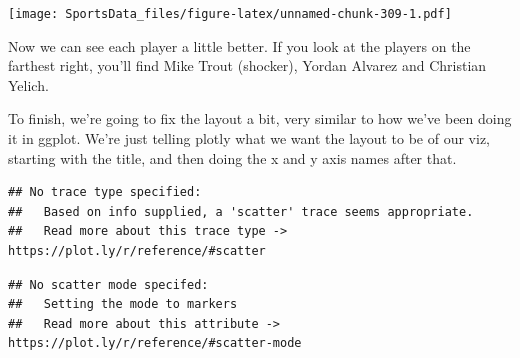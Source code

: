 \documentclass[
]{book}
\newenvironment{Shaded}{\begin{snugshade}}{\end{snugshade}}
\newcommand{\DataTypeTok}[1]{\textcolor[rgb]{0.13,0.29,0.53}{#1}}
\newcommand{\KeywordTok}[1]{\textcolor[rgb]{0.13,0.29,0.53}{\textbf{#1}}}
\newcommand{\NormalTok}[1]{#1}
\newcommand{\OperatorTok}[1]{\textcolor[rgb]{0.81,0.36,0.00}{\textbf{#1}}}
\newcommand{\StringTok}[1]{\textcolor[rgb]{0.31,0.60,0.02}{#1}}
\begin{document}
\texttt{[image: SportsData\_files/figure-latex/unnamed-chunk-309-1.pdf]}

Now we can see each player a little better. If you look at the players on the farthest right, you'll find Mike Trout (shocker), Yordan Alvarez and Christian Yelich.

To finish, we're going to fix the layout a bit, very similar to how we've been doing it in ggplot. We're just telling plotly what we want the layout to be of our viz, starting with the title, and then doing the x and y axis names after that.

\begin{Shaded}
\end{Shaded}

\begin{verbatim}
## No trace type specified:
##   Based on info supplied, a 'scatter' trace seems appropriate.
##   Read more about this trace type -> https://plot.ly/r/reference/#scatter
\end{verbatim}

\begin{verbatim}
## No scatter mode specifed:
##   Setting the mode to markers
##   Read more about this attribute -> https://plot.ly/r/reference/#scatter-mode
\end{verbatim}
\end{document}
